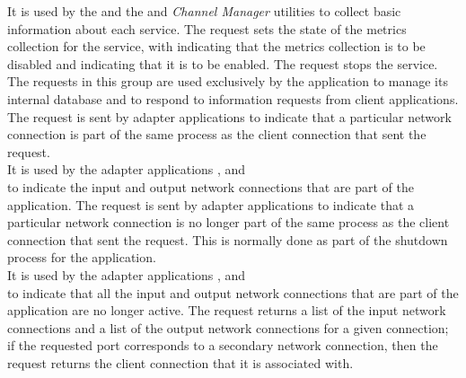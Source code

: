 It is used by the  and the
 and \emph{Channel Manager} utilities to collect basic
information about each service.
The  request sets the state of the metrics
collection for the service, with  indicating that the metrics collection is
to be disabled and  indicating that it is to be enabled.
The  request stops the service.
\secondaryEnd{}
The requests in this group are used exclusively by the
 application to manage its internal
database and to respond to information requests from client applications.
The  request is sent by
adapter applications to indicate that a particular \yarp{} network connection is part of
the same process as the client connection that sent the request.\\

It is used by the adapter applications ,
 and\\
 to indicate the input and output
\yarp{} network connections that are part of the application.
The  request is sent by
adapter applications to indicate that a particular \yarp{} network connection is no
longer part of the same process as the client connection that sent the request.
This is normally done as part of the shutdown process for the application.\\

It is used by the adapter applications ,
 and\\
 to indicate that all the input and
output \yarp{} network connections that are part of the application are no longer active.
The  request returns
a list of the input \yarp{} network connections and a list of the output \yarp{} network
connections for a given connection; if the requested port corresponds to a secondary
\yarp{} network connection, then the request returns the client connection that it is
associated with.\\

